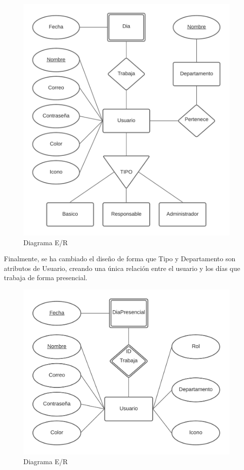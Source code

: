 \documentclass[11pt,spanish,listoffigures,listoftables]{tfgetsinf}
\begin{document}
\begin{figure}[h!] %
  \centering
   \includegraphics[scale=0.45]{img/EntidadRelacion.png}
   \caption{Diagrama E/R}
   \label{fig:diagramaer}
 \end{figure}

 Finalmente, se ha cambiado el diseño de forma que Tipo y Departamento son atributos de Usuario, creando una única relación entre el usuario y los días que trabaja de forma presencial.
 \begin{figure}[h!] %
  \centering
   \includegraphics[scale=0.45]{img/DiagramaERFinal.png}
   \caption{Diagrama E/R}
   \label{fig:diagramaerfinal}
 \end{figure}
\end{document}
